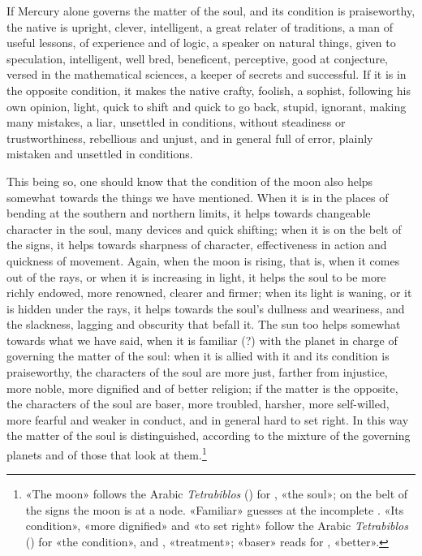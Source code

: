 \documentclass[11pt]{article}
\newcommand{\Fol}[1]{\marginpar{\footnotesize\color{gray}f.\,#1}}
\begin{document}
\par If Mercury alone governs the matter of the soul, and its condition is praiseworthy, the native is upright, clever, intelligent, a great relater of traditions, a man of useful lessons, of experience and of logic, a speaker on natural things, given to speculation, intelligent, well bred, beneficent, perceptive, good at conjecture, versed in the mathematical sciences, a keeper of secrets and successful. If it is in the opposite condition, it makes the native crafty, foolish, a sophist, following his own opinion, light, quick to shift and quick to go back, stupid, ignorant, making many mistakes, a liar, unsettled in conditions, without steadiness or trustworthiness, rebellious and unjust, and in general full of error, plainly mistaken and unsettled in conditions.\par
\par \Fol{61r}This being so, one should know that the condition of the moon also helps somewhat towards the things we have mentioned. When it is in the places of bending at the southern and northern limits, it helps towards changeable character in the soul, many devices and quick shifting; when it is on the belt of the signs, it helps towards sharpness of character, effectiveness in action and quickness of movement. Again, when the moon is rising, that is, when it comes out of the rays, or when it is increasing in light, it helps the soul to be more richly endowed, more renowned, clearer and firmer; when its light is waning, or it is hidden under the rays, it helps towards the soul's dullness and weariness, and the slackness, lagging and obscurity that befall it. The sun too helps somewhat towards what we have said, when it is familiar (?) with the planet in charge of governing the matter of the soul: when it is allied with it and its condition is praiseworthy, the characters of the soul are more just, farther from injustice, more noble, more dignified and of better religion; if the matter is the opposite, the characters of the soul are baser, more troubled, harsher, more self-willed, more fearful and weaker in conduct, and in general hard to set right. In this way the matter of the soul is distinguished, according to the mixture of the governing planets and of those that look at them.\footnote{«The moon» follows the Arabic \emph{Tetrabiblos} () for , «the soul»; on the belt of the signs the moon is at a node. «Familiar» guesses at the incomplete . «Its condition», «more dignified» and «to set right» follow the Arabic \emph{Tetrabiblos} () for «the condition»,  and , «treatment»; «baser» reads  for , «better».}\par
\end{document}
